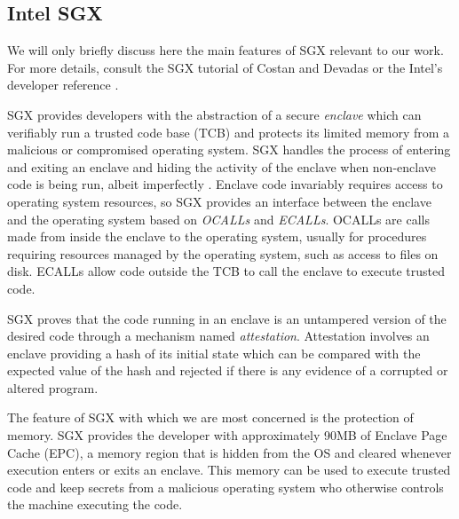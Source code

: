 \documentclass[conference]{IEEEtran}
\begin{document}
\subsection{Intel SGX}

We will only briefly discuss here the main features of SGX relevant to our work. For more details, consult the SGX tutorial of Costan and Devadas \cite{CD16} or the Intel's developer reference \cite{SGXRef}. 

SGX provides developers with the abstraction of a secure \textit{enclave} which can verifiably run a trusted code base (TCB) and protects its limited memory from a malicious or compromised operating system. SGX handles the process of entering and exiting an enclave and hiding the activity of the enclave when non-enclave code is being run, albeit imperfectly \cite{LSG+16}. Enclave code invariably requires access to operating system resources, so SGX provides an interface between the enclave and the operating system based on \textit{OCALLs} and \textit{ECALLs}. OCALLs are calls made from inside the enclave to the operating system, usually for procedures requiring resources managed by the operating system, such as access to files on disk. ECALLs allow code outside the TCB to call the enclave to execute trusted code. 

SGX proves that the code running in an enclave is an untampered version of the desired code through a mechanism named \textit{attestation}. Attestation involves an enclave providing a hash of its initial state which can be compared with the expected value of the hash and rejected if there is any evidence of a corrupted or altered program. 

The feature of SGX with which we are most concerned is the protection of memory. SGX provides the developer with approximately 90MB of Enclave Page Cache (EPC), a memory region that is hidden from the OS and cleared whenever execution enters or exits an enclave. This memory can be used to execute trusted code and keep secrets from a malicious operating system who otherwise controls the machine executing the code. 
\end{document}
